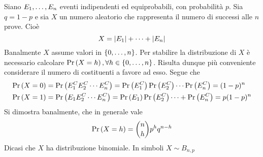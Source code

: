 \documentclass{subfiles}
\begin{document}
Siano \(\List{E}{1}{n}\) eventi indipendenti ed equiprobabili, con probabilità \(p\).
Sia \(q = 1 - p\) e sia \(X\) un numero aleatorio che rappresenta il numero di successi alle \(n\) prove.
Cioè
\[
    X = \left\vert {E_{1}} \right\vert + \cdots + \left\vert {E_{n}} \right\vert
\]
Banalmente \(X\) assume valori in \(\Set{0, \ldots, n}\).
Per stabilire la distribuzione di \(X\) è necessario calcolare \(\Prob{X = h}, \forall h \in \Set{0, \ldots, n}\).
Risulta dunque più conveniente considerare il numero di costituenti a favore ad esso.
Segue che
\[\begin{aligned}
        \Prob{X = 0} & = \Prob{E_{1}^{C}E_{2}^{C}\cdots E_{n}^{C}} = \Prob{E^{C}_{1}} \Prob{E^{C}_{2}} \cdots  \Prob{E^{C}_{n}} = (1 - p)^{n} \\
        \Prob{X = 1} & = \Prob{E_{1}E_{2}^{C}\cdots E_{n}^{C}} = \Prob{E_{1}} \Prob{E^{C}_{2}} \cdots + \Prob{E^{C}_{n}} = p(1 - p)^{n}       \\
    \end{aligned}\]
Si dimostra banalmente, che in generale vale
\[
    \Prob{X = h} = \binom{n}{h}p^{h}q^{n - h}
\]
Dicasi che \(X\) ha distribuzione binomiale. In simboli \(X \sim B_{n,p}\)
\end{document}
